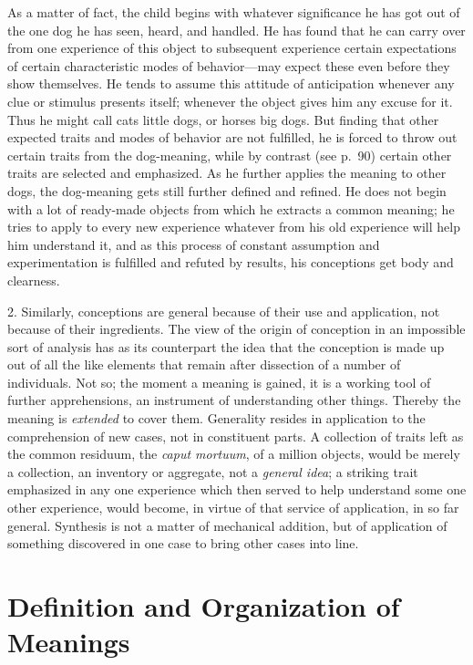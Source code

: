 \documentclass[letterpaper]{book}
\begin{document}
As a matter of fact, the child begins with whatever significance he has
got out of the one dog he has seen, heard, and handled. He has found
that he can carry over from one experience of this object to subsequent
experience certain expectations of certain characteristic modes of
behavior---may expect these even before they show themselves. He tends
to assume this attitude of anticipation whenever any clue or stimulus
presents itself; whenever the object gives him any excuse for it. Thus
he might call cats little dogs, or horses big dogs. But finding that
other expected traits and modes of behavior are not fulfilled, he is
forced to throw out certain traits from the dog-meaning, while by
contrast (see p.\ 90) certain other traits are selected and emphasized.
As he further applies the meaning to other dogs, the dog-meaning gets
still further defined and refined. He does not begin with a lot of
ready-made objects from which he extracts a common meaning; he tries to
apply to every new experience whatever from his old experience will help
him understand
it,
and as this process of constant assumption and experimentation is
fulfilled and refuted by results, his conceptions get body and
clearness.


2. Similarly, conceptions are general because of their use and
application, not because of their ingredients. The view of the origin of
conception in an impossible sort of analysis has as its counterpart the
idea that the conception is made up out of all the like elements that
remain after dissection of a number of individuals. Not so; the moment a
meaning is gained, it is a working tool of further apprehensions, an
instrument of understanding other things. Thereby the meaning is
\emph{extended} to cover them. Generality resides in application to the
comprehension of new cases, not in constituent parts. A collection of
traits left as the common residuum, the \emph{caput mortuum}, of a
million objects, would be merely a collection, an inventory or
aggregate, not a \emph{general idea}; a striking trait emphasized in any
one experience which then served to help understand some one other
experience, would become, in virtue of that service of application, in
so far general. Synthesis is not a matter of mechanical addition, but of
application of something discovered in one case to bring other cases
into line.

\section{Definition and Organization of Meanings}
\end{document}
